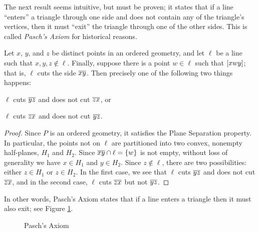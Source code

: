 The next result seems intuitive, but must be proven; it states that if a line ``enters'' a triangle through one side and does not contain any of the triangle's vertices, then it must ``exit'' the triangle through one of the other sides.
This is called \emph{Pasch's Axiom} for historical reasons.

\begin{prop}
Let \(x\), \(y\), and \(z\) be distinct points in an ordered geometry, and let \(\ell\) be a line such that \(x,y,z \notin \ell\).
Finally, suppose there is a point \(w \in \ell\) such that \([ x w y ]\); that is, \(\ell\) cuts the side \(\overline{xy}\).
Then precisely one of the following two things happens:
\begin{proplist}
\item \(\ell\) cuts \(\overline{yz}\) and does not cut \(\overline{zx}\), or
\item \(\ell\) cuts \(\overline{zx}\) and does not cut \(\overline{yz}\).
\end{proplist}
\end{prop}

\begin{proof}
Since \(P\) is an ordered geometry, it satisfies the Plane Separation property.
In particular, the points not on \(\ell\) are partitioned into two convex, nonempty half-planes, \(H_1\) and \(H_2\).
Since \(\overline{xy} \cap \ell = \{w\}\) is not empty, without loss of generality we have \(x \in H_1\) and \(y \in H_2\).
Since \(z \notin \ell\), there are two possibilities: either \(z \in H_1\) or \(z \in H_2\).
In the first case, we see that \(\ell\) cuts \(\overline{yz}\) and does not cut \(\overline{zx}\), and in the second case, \(\ell\) cuts \(\overline{zx}\) but not \(\overline{yz}\).
\end{proof}

In other words, Pasch's Axiom states that if a line enters a triangle then it must also exit; see Figure \ref{fig:pasch}.

\begin{figure}[h]
\begin{center}
\caption{\label{fig:pasch}Pasch's Axiom}
\end{center}
\end{figure}

